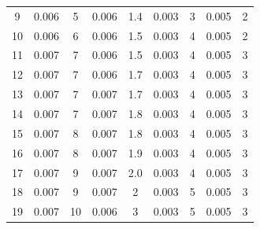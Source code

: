 \documentclass{article}
\begin{document}
{\begin{table}[H]
\begin{tabular}{ccc||cc||cc||cc}
        9  & 0.006                        & 5                              & 0.006                          & 1.4                          & 0.003     & 3                & 0.005     & 2                \\
        10 & 0.006                        & 6                              & 0.006                          & 1.5                          & 0.003     & 4                & 0.005     & 2                \\
        11 & 0.007                        & 7                              & 0.006                          & 1.5                          & 0.003     & 4                & 0.005     & 3                \\
        12 & 0.007                        & 7                              & 0.006                          & 1.7                          & 0.003     & 4                & 0.005     & 3                \\
        13 & 0.007                        & 7                              & 0.007                          & 1.7                          & 0.003     & 4                & 0.005     & 3                \\
        14 & 0.007                        & 7                              & 0.007                          & 1.8                          & 0.003     & 4                & 0.005     & 3                \\
        15 & 0.007                        & 8                              & 0.007                          & 1.8                          & 0.003     & 4                & 0.005     & 3                \\
        16 & 0.007                        & 8                              & 0.007                          & 1.9                          & 0.003     & 4                & 0.005     & 3                \\
        17 & 0.007                        & 9                              & 0.007                          & 2.0                          & 0.003     & 4                & 0.005     & 3                \\
        18 & 0.007                        & 9                              & 0.007                          & 2                            & 0.003     & 5                & 0.005     & 3                \\
        19 & 0.007                        & 10                             & 0.006                          & 3                            & 0.003     & 5                & 0.005     & 3                \\

\end{tabular}
\end{table}}
\end{document}

